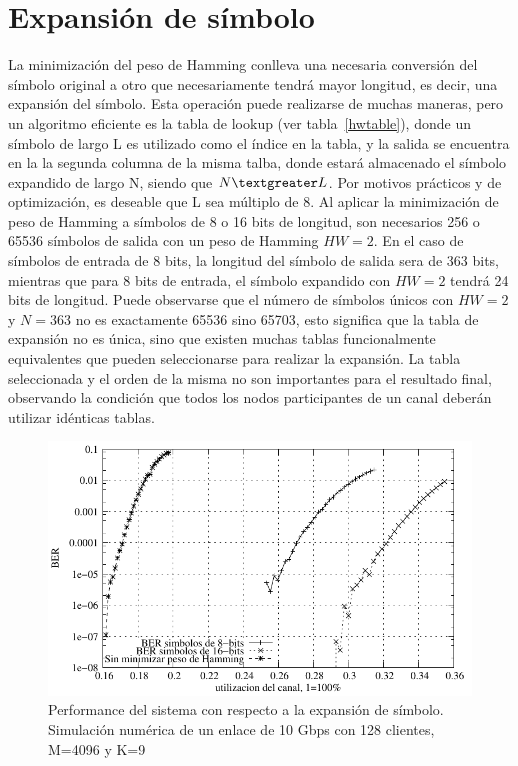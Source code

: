 \section{Expansión de símbolo}
La minimización del peso de Hamming conlleva una necesaria conversión del símbolo original a otro que necesariamente tendrá mayor longitud, es decir, una expansión del símbolo.
Esta operación puede realizarse de muchas maneras, pero un algoritmo eficiente es la tabla de lookup (ver tabla~\ref{hwtable}), donde un símbolo de largo L es utilizado como el índice en la tabla, y la salida se encuentra en la la segunda columna de la misma talba, donde estará almacenado el símbolo expandido de largo N, siendo que $N\textgreater L$.
Por motivos prácticos y de optimización, es deseable que L sea múltiplo de 8. Al aplicar la minimización de peso de Hamming a símbolos de 8 o 16 bits de longitud, son necesarios 256 o 65536 símbolos de salida con un peso de Hamming $HW=2$. En el caso de símbolos de entrada de 8 bits, la longitud del símbolo de salida sera de 363 bits, mientras que para 8 bits de entrada, el símbolo expandido con $HW=2$ tendrá 24 bits de longitud.
Puede observarse que el número de símbolos únicos con $HW=2$ y $N=363$ no es exactamente 65536 sino 65703, esto significa que la tabla de expansión no es única, sino que existen muchas tablas funcionalmente equivalentes que pueden seleccionarse para realizar la expansión.
La tabla seleccionada y el orden de la misma no son importantes para el resultado final, observando la condición que todos los nodos participantes de un canal deberán utilizar idénticas tablas.
\begin{figure}[!t]
  \centering
    \includegraphics[width=6in]{graphs/BERvsChannelES2}
    \caption{Performance del sistema con respecto a la expansión de símbolo. Simulación numérica de un enlace de 10 Gbps con 128 clientes, M=4096 y K=9}
    \label{BERvsExpansion}
\end{figure}


